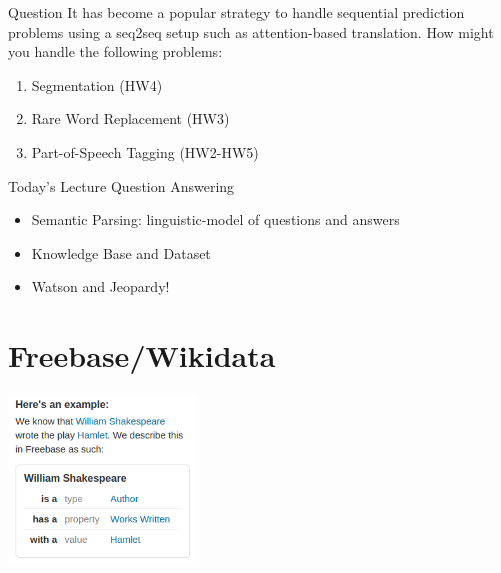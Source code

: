 \documentclass{beamer}
\begin{document}






\begin{frame}{Question}
  It has become a popular strategy to handle 
  sequential prediction problems using a seq2seq setup
  such as attention-based translation. How might you 
  handle the following problems: 

  \begin{enumerate}
  \item Segmentation (HW4)
  \item Rare Word Replacement (HW3)
  \item Part-of-Speech Tagging (HW2-HW5)
  \end{enumerate}
\end{frame}

\begin{frame}{Today's Lecture}
  Question Answering 
  \begin{itemize}
  \item Semantic Parsing: linguistic-model of questions and answers
    \air
  \item Knowledge Base and Dataset
    \air 
    
  \item Watson and Jeopardy!
  \end{itemize}
  
\end{frame}

{

}

{

}


\section{Freebase/Wikidata}

\begin{frame}
  \begin{center}
    \includegraphics[width=5cm]{freebase}
  \end{center}
\end{frame}
\end{document}
